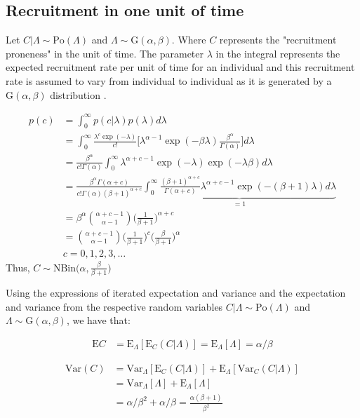 \subsection{Recruitment in one unit of time}

Let $C|\Lambda \sim \textrm{Po}(\Lambda)$ and $\Lambda \sim \textrm{G}(\alpha,\beta)$. Where $C$ represents the "recruitment proneness" in the unit of time. The parameter $\lambda$ in the integral represents the expected recruitment rate per unit of time for an individual and this recruitment rate is assumed to vary from individual to individual as it is generated by a $\textrm{G}(\alpha,\beta)$ distribution \citep{johnson2005univariate}.

\begin{align*}
p(c)&=\int^\infty_0 p(c|\lambda) p(\lambda) d\lambda\\
&=\int^\infty_0 \frac{\lambda^c\exp(-\lambda)}{c!}\Bigg[\lambda^{\alpha-1}\exp(-\beta\lambda)\frac{\beta^\alpha}{\Gamma(\alpha)}\Bigg]d\lambda\\
&=\frac{\beta^\alpha}{c!\Gamma(\alpha)}\int^\infty_0 \lambda^{\alpha+c-1}\exp(-\lambda)\exp(-\lambda\beta)d\lambda\\
&=\frac{\beta^\alpha\Gamma(\alpha+c)}{c!\Gamma(\alpha) (\beta+1)^{\alpha+c}}\underbrace{\int^\infty_0 \frac{(\beta+1)^{\alpha+c}}{\Gamma(\alpha+c)} \lambda^{\alpha+c-1}\exp(-(\beta+1)\lambda)d\lambda}_{=1}\\
&=\beta^\alpha\binom{\alpha+c-1}{\alpha-1}\Bigg (\frac{1}{\beta+1}\Bigg)^{\alpha+c}\\
&=\binom{\alpha+c-1}{\alpha-1}\Bigg (\frac{1}{\beta+1}\Bigg)^{c} \Bigg(\frac{\beta}{\beta+1}\Bigg)^{\alpha}\\
& c = 0,1,2,3,\ldots
\end{align*}
Thus, $C\sim \textrm{NBin} \Bigg(\alpha, \frac{\beta}{\beta+1}\Bigg)$



Using the expressions of iterated expectation and variance \citep{held2014applied} and the expectation and variance from the respective random variables $C|\Lambda \sim \textrm{Po}(\Lambda)$ and $\Lambda \sim \textrm{G}(\alpha,\beta)$, we have that:


\begin{align*}
\textrm{E}C &= \textrm{E}_{\Lambda}[\textrm{E}_{C} (C|\Lambda)] = \textrm{E}_{\Lambda}[\Lambda] = \alpha/\beta
\end{align*}

\begin{align*}
\textrm{Var}(C) &= \textrm{Var}_{\Lambda}[\textrm{E}_{C} (C|\Lambda)] + \textrm{E}_{\Lambda}[\textrm{Var}_C(C|\Lambda)]\\
&=\textrm{Var}_{\Lambda}[\Lambda] + \textrm{E}_{\Lambda}[\Lambda] \\
&=\alpha/\beta^2 + \alpha/\beta = \frac{\alpha(\beta+1)}{\beta^2}
\end{align*}


